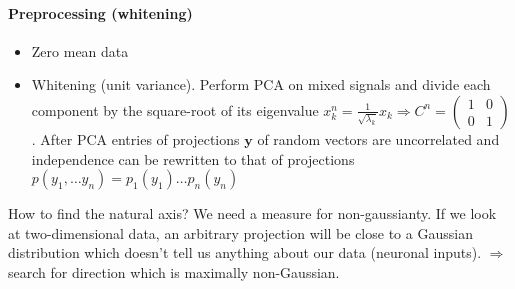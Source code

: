 \documentclass[11pt]{article}
\begin{document}
\paragraph{Preprocessing (whitening)} \begin{itemize}
\item Zero mean data
\item Whitening (unit variance). Perform PCA on mixed signals and divide each component by the square-root of its eigenvalue $x_k^n=\frac{1}{\sqrt{\lambda_k}}x_k \Rightarrow C^n=\begin{pmatrix}1 & 0 \\ 0 & 1\end{pmatrix}$. After PCA entries of projections $\mathbf{y}$ of random vectors are uncorrelated and independence can be rewritten to that of projections $p(y_1,\dots y_n)=p_1(y_1)\dots p_n(y_n)$
\end{itemize}
How to find the natural axis? We need a measure for non-gaussianty.
If we look at two-dimensional data, an arbitrary projection will be close to a Gaussian distribution which doesn't tell us anything about our data (neuronal inputs). $\Rightarrow$ search for direction which is maximally non-Gaussian.\\
\end{document}
